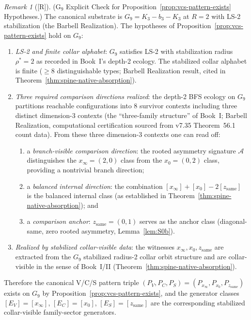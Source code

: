 \documentclass[12pt,oneside]{amsbook}
\theoremstyle{plain}
\theoremstyle{definition}
\theoremstyle{remark}
\newtheorem{remark}[theorem]{Remark}
\newcommand{\status}[1]{\textup{[#1]}}
\begin{document}
\begin{remark}[\status{R}]\label{rem:g9-vcs-certification}
\textup{(G$_9$ Explicit Check for Proposition~\ref{prop:vcs-pattern-exists} Hypotheses.)}
The canonical substrate is $G_9 = K_3 - b_3 - K_3$ at $R=2$ with
LS-2 stabilization (the Barbell Realization).  The hypotheses of
Proposition~\ref{prop:vcs-pattern-exists} hold on $G_9$:
\begin{enumerate}[label=\textup{(\arabic*)}]
  \item \emph{LS-2 and finite collar alphabet}: $G_9$ satisfies LS-2
    with stabilization radius $\rho^* = 2$ as recorded in Book~I's
    depth-2 ecology.  The stabilized collar alphabet is finite
    ($\geq 8$ distinguishable types; Barbell Realization result,
    cited in Theorem~\ref{thm:spine-native-absorption}).
  \item \emph{Three required comparison directions realized}: the
    depth-2 BFS ecology on $G_9$ partitions reachable configurations
    into 8 survivor contexts including three distinct dimension-3
    contexts (the ``three-family structure'' of Book~I; Barbell
    Realization, computational certification sourced from v7.35
    Theorem~56.1 count data).  From these three dimension-3 contexts
    one can read off:
    \begin{enumerate}[label=\textup{(\alph*)}]
      \item a \emph{branch-visible comparison direction}: the rooted
        asymmetry signature $\mathcal{A}$ distinguishes the
        $x_\infty = (2,0)$ class from the $x_0 = (0,2)$ class,
        providing a nontrivial branch direction;
      \item a \emph{balanced internal direction}: the combination
        $[x_\infty] + [x_0] - 2[z_{\mathrm{same}}]$ is the balanced
        internal class (as established in
        Theorem~\ref{thm:spine-native-absorption}); and
      \item a \emph{comparison anchor}: $z_{\mathrm{same}} = (0,1)$
        serves as the anchor class (diagonal-same, zero rooted
        asymmetry, Lemma~\ref{lem:S0b}).
    \end{enumerate}
  \item \emph{Realized by stabilized collar-visible data}: the
    witnesses $x_\infty, x_0, z_{\mathrm{same}}$ are extracted from
    the $G_9$ stabilized radius-2 collar orbit structure and are
    collar-visible in the sense of Book~I/II
    (Theorem~\ref{thm:spine-native-absorption}).
\end{enumerate}
Therefore the canonical V/C/S pattern triple
$(P_V, P_C, P_S) = (P_{x_\infty}, P_{x_0}, P_{z_{\mathrm{same}}})$
exists on $G_9$ by Proposition~\ref{prop:vcs-pattern-exists}, and the
generator classes $[E_V] = [x_\infty]$, $[E_C] = [x_0]$,
$[E_S] = [z_{\mathrm{same}}]$ are the corresponding stabilized
collar-visible family-sector generators.


\end{remark}
\end{document}

